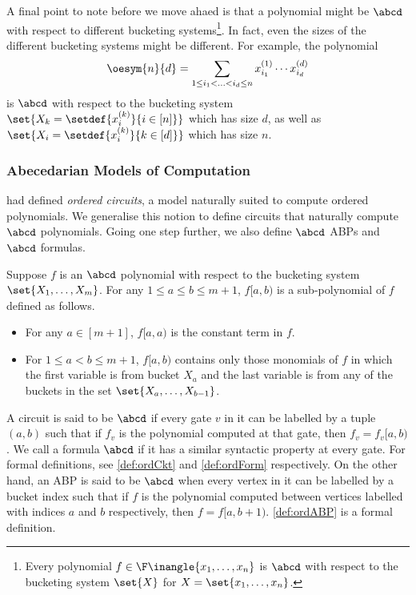 A final point to note before we move ahaed is that a polynomial might be $\abcd$ with respect to different bucketing systems\footnote{Every polynomial $f \in \F\inangle{x_1, \ldots, x_n}$ is $\abcd$ with respect to the bucketing system $\set{X}$ for $X = \set{x_1, \ldots, x_n}$.}. 
In fact, even the sizes of the different bucketing systems might be different. 
For example, the polynomial
\[
	\oesym{n}{d} = \sum_{1 \leq i_1 < \ldots < i_d \leq n} x^{(1)}_{i_1} \cdots x^{(d)}_{i_d}
\]
is $\abcd$ with respect to the bucketing system $\set{X_k = \setdef{x^{(k)}_i}{i \in [n]}}$ which has size $d$, as well as $\set{X_i = \setdef{x^{(k)}_i}{k \in [d]}}$ which has size $n$.

\subsubsection*{Abecedarian Models of Computation}

{\Hrubes} {\etal} \cite{HWY11} had defined \emph{ordered circuits}, a model naturally suited to compute ordered polynomials.
We generalise this notion to define circuits that naturally compute $\abcd$ polynomials.
Going one step further, we also define $\abcd$ ABPs and $\abcd$ formulas.

Suppose $f$ is an $\abcd$ polynomial with respect to the bucketing system $\set{X_1, \ldots, X_m}$. 
For any $1 \leq a \leq b \leq m+1$, $f[a,b)$ is a sub-polynomial of $f$ defined as follows.
\begin{itemize}
	\item For any $a \in [m+1]$, $f[a, a)$ is the constant term in $f$.
	\item For $1 \leq a < b \leq m+1$, $f[a,b)$ contains only those monomials of $f$ in which the first variable is from bucket $X_a$ and the last variable is from any of the buckets in the set $\set{X_a, \ldots, X_{b-1}}$. \qedhere
\end{itemize}

A circuit is said to be $\abcd$ if every gate $v$ in it can be labelled by a tuple $(a,b)$ such that if $f_v$ is the polynomial computed at that gate, then $f_v = f_v[a,b)$.
We call a formula $\abcd$ if it has a similar syntactic property at every gate. 
For formal definitions, see \autoref{def:ordCkt} and \autoref{def:ordForm} respectively.
On the other hand, an ABP is said to be $\abcd$ when every vertex in it can be labelled by a bucket index such that if $f$ is the polynomial computed between vertices labelled with indices $a$ and $b$ respectively, then $f = f[a,b+1)$. 
\autoref{def:ordABP} is a formal definition.

